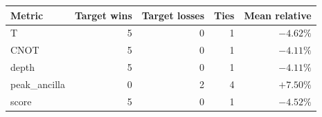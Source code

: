 \begin{tabular}{lrrrr}
\toprule
Metric & Target wins & Target losses & Ties & Mean relative \\
\midrule
T & 5 & 0 & 1 & $-4.62\%$ \\
CNOT & 5 & 0 & 1 & $-4.11\%$ \\
depth & 5 & 0 & 1 & $-4.11\%$ \\
peak_ancilla & 0 & 2 & 4 & $+7.50\%$ \\
score & 5 & 0 & 1 & $-4.52\%$ \\
\bottomrule
\end{tabular}
